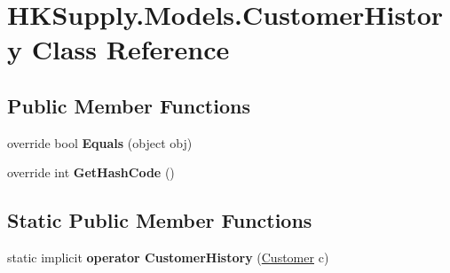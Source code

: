 \hypertarget{class_h_k_supply_1_1_models_1_1_customer_history}{}\section{H\+K\+Supply.\+Models.\+Customer\+History Class Reference}
\label{class_h_k_supply_1_1_models_1_1_customer_history}
\subsection*{Public Member Functions}
\begin{DoxyCompactItemize}
\item 
\mbox{\label{class_h_k_supply_1_1_models_1_1_customer_history_a7b1d5ad2746e1733fecebb4744187e22}} 
override bool {\bfseries Equals} (object obj)
\item 
\mbox{\label{class_h_k_supply_1_1_models_1_1_customer_history_a9ce1510ea0fc18dfb2797f758fbcb88e}} 
override int {\bfseries Get\+Hash\+Code} ()
\end{DoxyCompactItemize}
\subsection*{Static Public Member Functions}
\begin{DoxyCompactItemize}
\item 
\mbox{\label{class_h_k_supply_1_1_models_1_1_customer_history_a1d54538a20700d9fd1b68cf979830fad}} 
static implicit {\bfseries operator Customer\+History} (\mbox{\hyperlink{class_h_k_supply_1_1_models_1_1_customer}{Customer}} c)
\end{DoxyCompactItemize}
